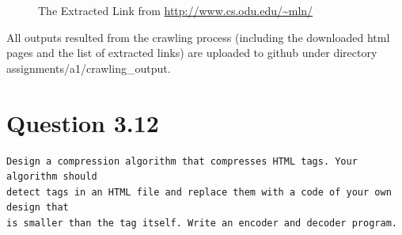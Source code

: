 \documentclass[letterpaper,11pt]{article}
\begin{document}
\begin{figure}[H]


\centering

\caption{The Extracted Link from \url{http://www.cs.odu.edu/~mln/}}

\label{fig:url}

\end{figure} 

All outputs resulted from the crawling process (including the downloaded html pages and the list of extracted links) are uploaded to github under directory assignments/a1/crawling\_output. 

\noindent\makebox[\linewidth]{\rule{\textwidth}{0.4pt}}

\section*{Question 3.12}
\begin{verbatim}
Design a compression algorithm that compresses HTML tags. Your algorithm should
detect tags in an HTML file and replace them with a code of your own design that
is smaller than the tag itself. Write an encoder and decoder program.
\end{verbatim}
\end{document}

